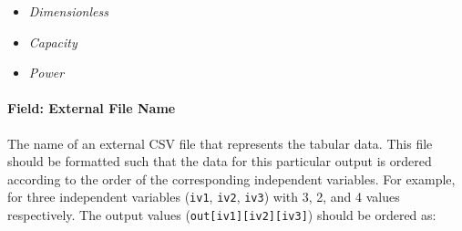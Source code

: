 \begin{itemize}
  \tightlist
  \item
  \emph{Dimensionless}
  \item
  \emph{Capacity}
  \item
  \emph{Power}
\end{itemize}

\paragraph{Field: External File
Name}\label{field-external-file-name}

The name of an external CSV file that represents the tabular data. This
file should be formatted such that the data for this particular output
is ordered according to the order of the corresponding independent
variables. For example, for three independent variables (\texttt{iv1},
\texttt{iv2}, \texttt{iv3}) with 3, 2, and 4 values respectively. The
output values (\texttt{out{[}iv1{]}{[}iv2{]}{[}iv3{]}}) should be
ordered as:

